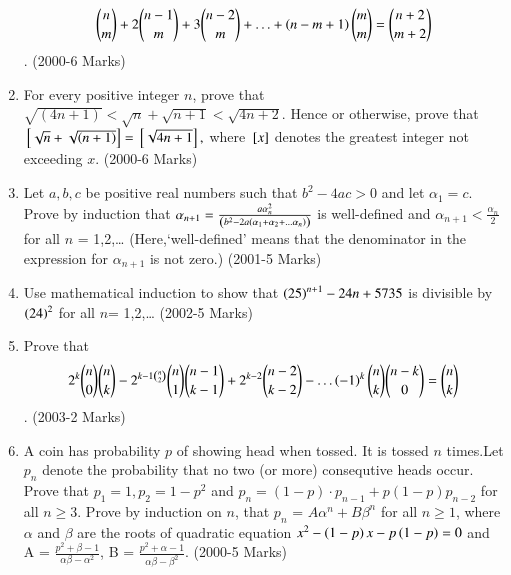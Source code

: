 \documentclass[journal]{IEEEtran}
\begin{document}
\begin{enumerate}[start=16]
\begin{align}
\binom{n}{m} +2\binom{n-1}{m} +3\binom{n-2}{m}+\ldots+ \left(n-m+1\right) \binom{m}{m} = \binom{n+2}{m+2}
\end{align}.
\hfill(2000-6 Marks)
\item
For every positive integer $n$, prove that $\sqrt{(4n+1)} < \sqrt{n} +\sqrt{n+1} < \sqrt{4n+2}$. Hence or otherwise, prove that ${}\left[\sqrt{n} + \sqrt{\left(n+1\right)}\right]= {}\left[\sqrt{4n+1}\right],$ where ${}\left[x\right]$ denotes the greatest integer not exceeding $x$.
\hfill(2000-6 Marks)
\item
Let $a,b,c$ be positive real numbers such that $b^2 - 4ac > 0$ and let $\alpha_1 = c$. Prove by induction that $\alpha_{n+1} = \frac{a\alpha_{n}^2}{\left(b^2 - 2a \left(\alpha_1 + \alpha_2 + \ldots \alpha_n\right)\right)}$ is well-defined and $\alpha_{n+1} < \frac{\alpha_n}{2}$ for all $n$ = 1,2,\ldots
(Here,`well-defined' means that the denominator in the expression for $\alpha_{n+1}$ is not zero.)
\hfill(2001-5 Marks)
\item
Use mathematical induction to show that $\left(25\right)^{n+1} - 24 n + 5735$ is divisible by $\left(24\right)^2$ for all $n$= 1,2,\ldots
\hfill(2002-5 Marks)
\item 
Prove that
\begin{align}
2^k \binom{n}{0}\binom{n}{k} - 2^{k-1\binom{n}{2}} \binom{n}{1} \binom{n-1}{k-1} + 2^{k-2}\binom{n-2}{k-2} - \ldots \left(-1\right)^k \binom{n}{k}\binom{n-k}{0} = \binom{n}{k}
\end{align}.
\hfill(2003-2 Marks)
\item
A coin has probability $p$ of showing head when tossed. It is tossed $n$ times.Let $p_n$ denote the probability that no two (or more) consequtive heads occur. Prove that $p_1=1 , p_2=1-p^2$ and $p_n = (1-p)\cdot p_{n-1} + p(1-p)p_{n-2}$ for all $ n \geq 3 $. Prove by induction on $n$, that $p_n$ = $A\alpha^n + B\beta^n$ for all $n \geq 1$, where $\alpha$ and $\beta$ are the roots of quadratic equation $x^2 - \left(1-p\right)x - p\left(1-p\right) = 0$ and A = $\frac{p^2 + \beta -1}{\alpha\beta-\alpha^2}$, B = $\frac{p^2 + \alpha -1}{\alpha\beta - \beta^2}$.
\hfill(2000-5 Marks)



\end{enumerate}
\end{document}
